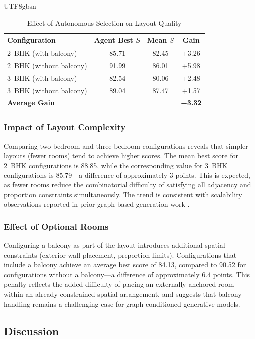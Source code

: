 \documentclass[11pt]{article}
\let\cite\citep
\providecommand\citep{\cite}
\begin{document}
\begin{CJK}{UTF8}{gbsn}
\begin{table}[!t]
\caption{Effect of Autonomous Selection on Layout Quality}
\centering
\begin{tabular}{|l|c|c|c|}
\hline
\textbf{Configuration} & \textbf{Agent Best $S$} & \textbf{Mean $S$} & \textbf{Gain} \\
\hline
2~BHK (with balcony) & 85.71 & 82.45 & +3.26 \\
\hline
2~BHK (without balcony) & 91.99 & 86.01 & +5.98 \\
\hline
3~BHK (with balcony) & 82.54 & 80.06 & +2.48 \\
\hline
3~BHK (without balcony) & 89.04 & 87.47 & +1.57 \\
\hline
\multicolumn{3}{|l|}{\textbf{Average Gain}} & \textbf{+3.32} \\
\hline
\end{tabular}
\label{tab:ablation_selection}
\end{table}

\subsubsection*{Impact of Layout Complexity}
Comparing two-bedroom and three-bedroom configurations reveals that simpler layouts (fewer rooms) tend to achieve higher scores. The mean best score for 2~BHK configurations is 88.85, while the corresponding value for 3~BHK configurations is 85.79—a difference of approximately 3 points. This is expected, as fewer rooms reduce the combinatorial difficulty of satisfying all adjacency and proportion constraints simultaneously. The trend is consistent with scalability observations reported in prior graph-based generation work \cite{b16}.

\subsubsection*{Effect of Optional Rooms}
Configuring a balcony as part of the layout introduces additional spatial constraints (exterior wall placement, proportion limits). Configurations that include a balcony achieve an average best score of 84.13, compared to 90.52 for configurations without a balcony—a difference of approximately 6.4 points. This penalty reflects the added difficulty of placing an externally anchored room within an already constrained spatial arrangement, and suggests that balcony handling remains a challenging case for graph-conditioned generative models.

\subsection*{Discussion}


\end{CJK}
\end{document}
